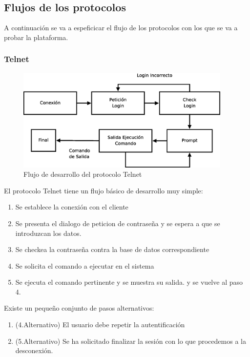\documentclass[a4paper,spanish,12pt]{book}
\begin{document}
\subsection{Flujos de los protocolos}
A continuación se va a espeficicar el flujo de los protocolos con los que se va a probar la plataforma.

\subsubsection{Telnet}
\begin{figure}[h]
	\includegraphics[width=0.95\textwidth]{img/DiagramaFlujoTelnet.eps}
              \caption{Flujo de desarrollo del protocolo Telnet}
  \label{fig:DiagramaFlujoTelnet}
\end{figure}

El protocolo Telnet tiene un flujo básico de desarrollo muy simple:
\begin{enumerate}
	\item Se establece la conexión con el cliente
	\item Se presenta el dialogo de peticion de contraseña y se espera a que se introduzcan los datos.
	\item Se checkea la contraseña contra la base de datos correspondiente
	\item Se solicita el comando a ejecutar en el sistema
	\item Se ejecuta el comando pertinente y se muestra su salida. y se vuelve al paso 4.
\end{enumerate}
Existe un pequeño conjunto de pasos alternativos:
\begin{enumerate}
	\item (4.Alternativo) El usuario debe repetir la autentificación
	\item (5.Alternativo) Se ha solicitado finalizar la sesión con lo que procedemos a la desconexión.
\end{enumerate}
\end{document}
